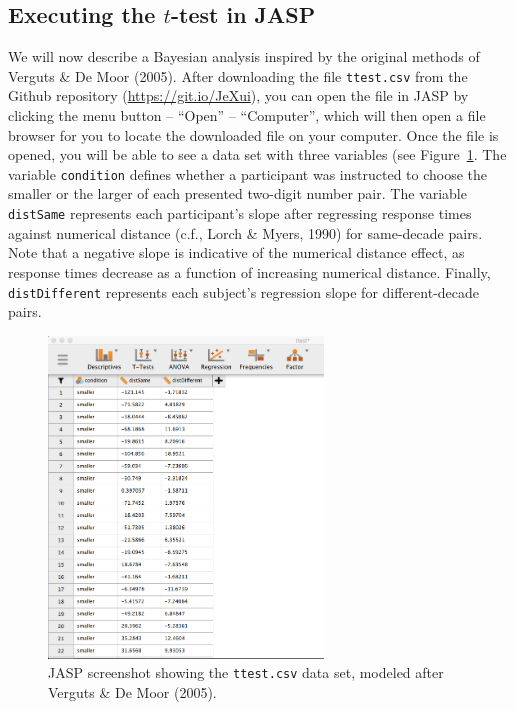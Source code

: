 \documentclass[english,,doc,floatsintext]{apa6}
\begin{document}
\hypertarget{executing-the-t-test-in-jasp}{%
\subsection{\texorpdfstring{Executing the \(t\)-test in JASP}{Executing the t-test in JASP}}\label{executing-the-t-test-in-jasp}}

We will now describe a Bayesian analysis inspired by the original methods of Verguts \& De Moor (2005). After downloading the file \texttt{ttest.csv} from the Github repository (\url{https://git.io/JeXui}), you can open the file in JASP by clicking the menu button -- \enquote{Open} -- \enquote{Computer}, which will then open a file browser for you to locate the downloaded file on your computer. Once the file is opened, you will be able to see a data set with three variables (see Figure~\ref{fig:ttestData}. The variable \texttt{condition} defines whether a participant was instructed to choose the smaller or the larger of each presented two-digit number pair. The variable \texttt{distSame} represents each participant's slope after regressing response times against numerical distance (c.f., Lorch \& Myers, 1990) for same-decade pairs. Note that a negative slope is indicative of the numerical distance effect, as response times decrease as a function of increasing numerical distance. Finally, \texttt{distDifferent} represents each subject's regression slope for different-decade pairs.

\begin{figure}[htbp]
\centering
\includegraphics[width=0.65\textwidth,height=\textheight]{figures/ttestData.png}
\caption{\label{fig:ttestData}JASP screenshot showing the \texttt{ttest.csv} data set, modeled after Verguts \& De Moor (2005).}
\end{figure}
\end{document}
